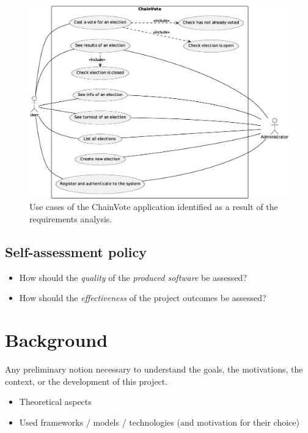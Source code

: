 \documentclass{scrartcl}
\begin{document}
\begin{figure}
    \centering
    \includegraphics[width=\linewidth]{figures/use-cases.eps}
    \caption{Use cases of the ChainVote application identified as a result of the requirements analysis.}
    \label{fig:use-cases-diagram} 
\end{figure}

\subsection{Self-assessment policy}

\begin{itemize}
    \item How should the \emph{quality} of the \emph{produced software} be assessed?
    
    \item How should the \emph{effectiveness} of the project outcomes be assessed?
\end{itemize}

\section{Background}

Any preliminary notion necessary to understand the goals, the motivations, the context, or the development of this project.
%
\begin{itemize}
    \item Theoretical aspects
    
    \item Used frameworks / models / technologies (and motivation for their choice)
\end{itemize}
\end{document}
